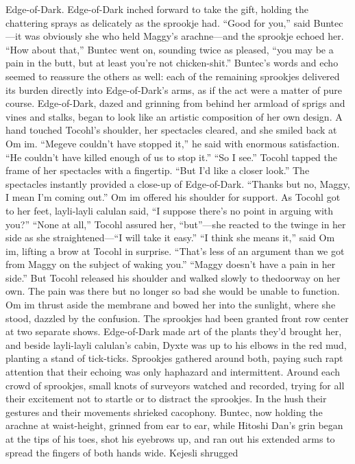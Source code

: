 \documentclass[9pt]{article}
\begin{document}
Edge-of-Dark.
Edge-of-Dark inched forward to take the gift, holding the chattering sprays as delicately as the
sprookje had.
“Good for you,” said Buntec—it was obviously she who held Maggy’s arachne—and the sprookje
echoed her. “How about that,” Buntec went on, sounding twice as pleased, “you may be a pain in the
butt, but at least you’re not chicken-shit.”
Buntec’s words and echo seemed to reassure the others as well: each of the remaining sprookjes
delivered its burden directly into Edge-of-Dark’s arms, as if the act were a matter of pure course.
Edge-of-Dark, dazed and grinning from behind her armload of sprigs and vines and stalks, began to look
like an artistic composition of her own design.
A hand touched Tocohl’s shoulder, her spectacles cleared, and she smiled back at Om im.
“Megeve couldn’t have stopped it,” he said with enormous satisfaction. “He couldn’t have killed
enough of us to stop it.”
“So I see.” Tocohl tapped the frame of her spectacles with a fingertip. “But I’d like a closer look.”
The spectacles instantly provided a close-up of Edge-of-Dark. “Thanks but no, Maggy, I mean I’m
coming out.”
Om im offered his shoulder for support. As Tocohl got to her feet, layli-layli calulan said, “I
suppose there’s no point in arguing with you?”
“None at all,” Tocohl assured her, “but”—she reacted to the twinge in her side as she
straightened—“I will take it easy.”
“I think she means it,” said Om im, lifting a brow at Tocohl in surprise. “That’s less of an argument
than we got from Maggy on the subject of waking you.”
“Maggy doesn’t have a pain in her side.” But Tocohl released his shoulder and walked slowly to thedoorway on her own. The pain was there but no longer so bad she would be unable to function.
Om im thrust aside the membrane and bowed her into the sunlight, where she stood, dazzled by the
confusion.
The sprookjes had been granted front row center at two separate shows. Edge-of-Dark made art of
the plants they’d brought her, and beside layli-layli calulan’s cabin, Dyxte was up to his elbows in the
red mud, planting a stand of tick-ticks. Sprookjes gathered around both, paying such rapt attention that
their echoing was only haphazard and intermittent.
Around each crowd of sprookjes, small knots of surveyors watched and recorded, trying for all their
excitement not to startle or to distract the sprookjes.
In the hush their gestures and their movements shrieked cacophony. Buntec, now holding the arachne
at waist-height, grinned from ear to ear, while Hitoshi Dan’s grin began at the tips of his toes, shot his
eyebrows up, and ran out his extended arms to spread the fingers of both hands wide. Kejesli shrugged
\end{document}
